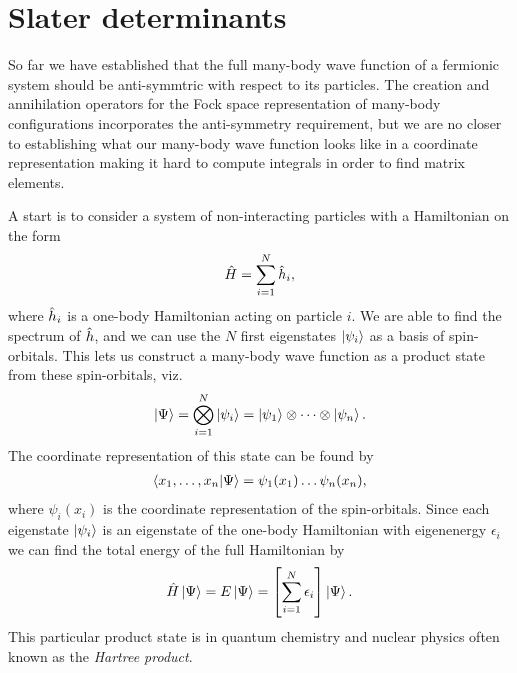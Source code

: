     \section{Slater determinants}
        \label{sec:slater-determinants}
        So far we have established that the full many-body wave function of a
        fermionic system should be anti-symmtric with respect to its particles.
        The creation and annihilation operators for the Fock space
        representation of many-body configurations incorporates the
        anti-symmetry requirement, but we are no closer to establishing what our
        many-body wave function looks like in a coordinate representation making
        it hard to compute integrals in order to find matrix elements.

        A start is to consider a system of non-interacting particles with a
        Hamiltonian on the form
        \begin{align}
            \hat{H} = \sum_{i = 1}^{N} \hat{h}_i,
        \end{align}
        where $\hat{h}_i$ is a one-body Hamiltonian acting on particle $i$. We
        are able to find the spectrum of $\hat{h}$, and we can use the $N$
        first eigenstates $\ket{\psi_i}$ as a basis of spin-orbitals.
        This lets us construct a many-body wave function as a product state from
        these spin-orbitals, viz.
        \begin{align}
            \ket{\Psi}
            = \bigotimes_{i = 1}^{N}\ket{\psi_i}
            = \ket{\psi_1}\otimes\dots\otimes\ket{\psi_n}.
        \end{align}
        The coordinate representation of this state can be found by
        \begin{align}
            \braket{x_1, \dots, x_n}{\Psi}
            = \psi_1(x_1)\dots\psi_n(x_n),
        \end{align}
        where $\psi_i(x_i)$ is the coordinate representation of the
        spin-orbitals.
        Since each eigenstate $\ket{\psi_i}$ is an eigenstate of the one-body
        Hamiltonian with eigenenergy $\epsilon_i$ we can find the total energy
        of the full Hamiltonian by
        \begin{align}
            \hat{H}\ket{\Psi}
            = E\ket{\Psi}
            = \left[ 
                \sum_{i = 1}^{N}
                \epsilon_i
             \right]\ket{\Psi}.
        \end{align}
        This particular product state is in quantum chemistry and nuclear
        physics often known as the \emph{Hartree product}.
